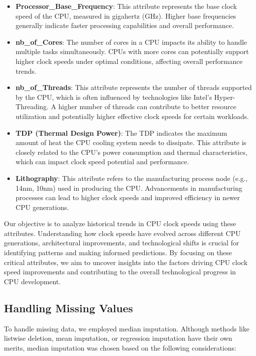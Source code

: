 \begin{itemize}
    \item \textbf{Processor\_Base\_Frequency}: This attribute represents the base clock speed of the CPU, measured in gigahertz (GHz). Higher base frequencies generally indicate faster processing capabilities and overall performance.
    \item \textbf{nb\_of\_Cores}: The number of cores in a CPU impacts its ability to handle multiple tasks simultaneously. CPUs with more cores can potentially support higher clock speeds under optimal conditions, affecting overall performance trends.
    \item \textbf{nb\_of\_Threads}: This attribute represents the number of threads supported by the CPU, which is often influenced by technologies like Intel's Hyper-Threading. A higher number of threads can contribute to better resource utilization and potentially higher effective clock speeds for certain workloads.
    \item \textbf{TDP (Thermal Design Power)}: The TDP indicates the maximum amount of heat the CPU cooling system needs to dissipate. This attribute is closely related to the CPU's power consumption and thermal characteristics, which can impact clock speed potential and performance.
    \item \textbf{Lithography}: This attribute refers to the manufacturing process node (e.g., 14nm, 10nm) used in producing the CPU. Advancements in manufacturing processes can lead to higher clock speeds and improved efficiency in newer CPU generations.
\end{itemize}

Our objective is to analyze historical trends in CPU clock speeds using these attributes. Understanding how clock speeds have evolved across different CPU generations, architectural improvements, and technological shifts is crucial for identifying patterns and making informed predictions. By focusing on these critical attributes, we aim to uncover insights into the factors driving CPU clock speed improvements and contributing to the overall technological progress in CPU development.\\

\subsection{Handling Missing Values}

To handle missing data, we employed median imputation. Although methods like listwise deletion, mean imputation, or regression imputation have their own merits, median imputation was chosen based on the following considerations:


